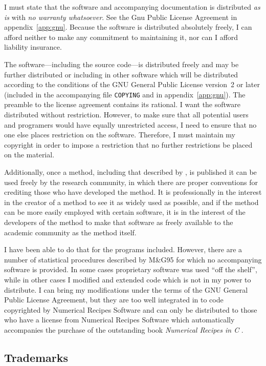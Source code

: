 \documentclass[%
	11pt,
        a4paper,
        twoside]{workrep}
\newcommand*{\file}[1]{\texttt{#1}}		%
\newcommand*{\scare}[1]{{``}#1\/{''}}		%
\newcommand*{\btitle}[1]{\emph{#1}}		%
\newcommand{\MG}{M\&G95\xspace}			%
\newcommand{\dash}{---}
\begin{document}
I must state that the software and accompanying documentation is
distributed \emph{as is} with \emph{no warranty whatsoever}.  See
the Gnu Public License Agreement in appendix~\ref{app:gnu}.  Because
the software is distributed absolutely freely, I can afford neither
to make any commitment to maintaining it, nor can I afford liability
insurance.

The software\dash including the source code\dash is distributed
freely and may be further distributed or including in other software
which will be distributed according to the conditions of the GNU
General Public License version~2 or later (included in the
accompanying file \file{COPYING} and in appendix~\ref{app:gnu}).  The
preamble to the license agreement contains its rational.  I want the
software distributed without restriction.  However, to make sure that
all potential users and programers would have equally unrestricted
access, I need to ensure that no one else places restriction on the
software.  Therefore, I must maintain my copyright in order to impose
a restriction that no further restrictions be placed on the material.

Additionally, once a method, including that described by
, is published it can be used
freely by the research community, in which there are proper
conventions for crediting those who have developed the method.  It is
professionally in the interest in the creator of a method to see it
as widely used as possible, and if the method can be more easily
employed with certain software, it is in the interest of the
developers of the method to make that software as freely available to
the academic community as the method itself.

I have been able to do that for the programs included.  However,
there are a number of statistical procedures described by \MG for
which no accompanying software is provided.  In some cases
proprietary software was used \scare{off the shelf}, while in other
cases I modified and extended code which is not in my power to
distribute.  I can bring my modifications under the terms of the GNU
General Public License Agreement, but they are too well integrated in
to code copyrighted by Numerical Recipes Software and can only be
distributed to those who have a license from Numerical Recipes
Software which automatically accompanies the purchase of the
outstanding book \btitle{Numerical Recipes in C}
\cite{PressETAL88:Book}.

\subsection{Trademarks}
\end{document}
